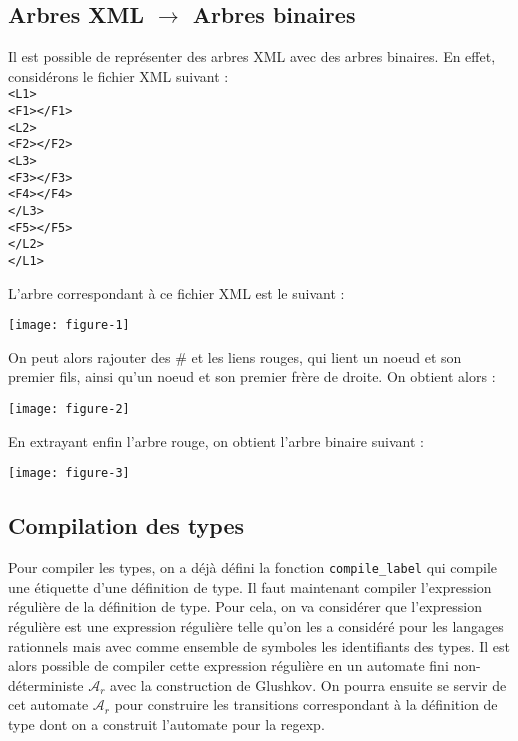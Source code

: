 \documentclass[a4paper, 11pt]{article}
\begin{document}
\subsection*{Arbres XML $\rightarrow$ Arbres binaires}

Il est possible de représenter des arbres XML avec des arbres binaires.
En effet, considérons le fichier XML suivant :
\\\texttt{<L1>}
\\\null\quad \texttt{<F1></F1>}
\\\null\quad \texttt{<L2>}
\\\null\qquad \texttt{<F2></F2>}
\\\null\qquad \texttt{<L3>}
\\\null\qquad\quad \texttt{<F3></F3>}
\\\null\qquad\quad \texttt{<F4></F4>}
\\\null\qquad \texttt{</L3>}
\\\null\qquad \texttt{<F5></F5>}
\\\null\quad \texttt{</L2>}
\\\texttt{</L1>}

L'arbre correspondant à ce fichier XML est le suivant :\\
\begin{center}
  \texttt{[image: figure-1]}
\end{center}

On peut alors rajouter des $\#$ et les liens rouges, qui lient un noeud et son
premier fils, ainsi qu'un noeud et son premier frère de droite. On obtient
alors :\\
\begin{center}
  \texttt{[image: figure-2]}
\end{center}

En extrayant enfin l'arbre rouge, on obtient l'arbre binaire suivant :\\
\begin{center}
  \texttt{[image: figure-3]}
\end{center}

\subsection*{Compilation des types}

Pour compiler les types, on a déjà défini la fonction \texttt{compile\_label}
qui compile une étiquette d'une définition de type. Il faut maintenant compiler
l'expression régulière de la définition de type. Pour cela, on va considérer que
l'expression régulière est une expression régulière telle qu'on les a considéré
pour les langages rationnels mais avec comme ensemble de symboles les
identifiants des types. Il est alors possible de compiler cette expression
régulière en un automate fini non-déterministe $\mathcal{A}_r$ avec la
construction de Glushkov. On pourra ensuite se servir de cet automate
$\mathcal{A}_r$ pour construire les transitions correspondant à la définition de
type dont on a construit l'automate pour la regexp.
\end{document}
